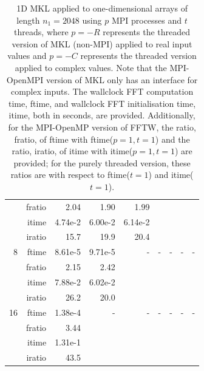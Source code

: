 \documentclass[a4]{article}
\begin{document}
\begin{table}
\begin{center}
\begin{tabular}{|r|r|r|r|r|r|r|r|r|}
      & fratio &  2.04 &   1.90 &   1.99 &      &  &  &  \\
      & itime &   4.74e-2 &   6.00e-2 &   6.14e-2    &   & & & \\
      & iratio &   15.7 &   19.9 &   20.4 &    & & &  \\ \hline
    8  & ftime &   8.61e-5 &   9.71e-5 &     - & - & - & - & - \\ 
      & fratio &     2.15 &   2.42 &    &  &  &  &  \\
      & itime &       7.88e-2 &   6.02e-2  &    & & & & \\
      & iratio &     26.2 &   20.0 &    & & & & \\ \hline
    16 & ftime  &    1.38e-4 &    - & - & - & - & - & - \\ 
     & fratio &     3.44 &   &  &  &  &  &  \\
      & itime &     1.31e-1 &  & & & & & \\
      & iratio &      43.5 &    & & & & & \\ \hline
\end{tabular}
\caption{1D MKL applied to one-dimensional arrays of length $n_1=2048$ using $p$ MPI processes and $t$ threads, where $p=-R$ represents the threaded version of MKL (non-MPI) applied to real input values and $p=-C$ represents the threaded version applied to complex values. Note that the MPI-OpenMPI version of MKL only has an interface for complex inputs. The wallclock FFT computation time, ftime, and wallclock FFT initialisation time, itime, both in seconds, are provided. Additionally, for the MPI-OpenMP version of FFTW, the ratio, fratio, of ftime  with ftime($p=1,t=1$) and the ratio, iratio, of itime  with itime($p=1,t=1$) are provided; for the purely threaded version, these ratios are with respect to ftime($t=1$) and itime($t=1$). }\label{Tbl:MKL1d2048}
\end{center}
\end{table}
\end{document}
